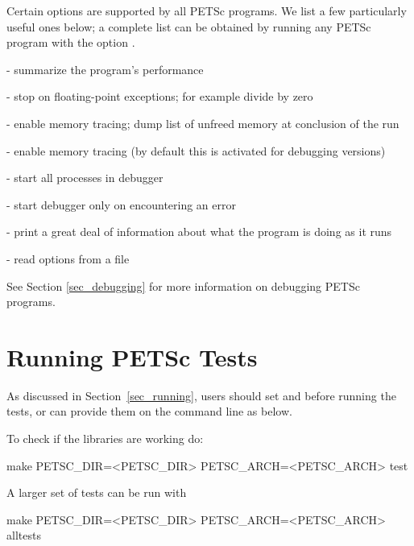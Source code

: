 Certain options are supported by all PETSc programs.  We list a few
particularly useful ones below; a complete list can be obtained by
running any PETSc program with the option .
\begin{tightitemize}
\item {} - summarize the program's performance
\item {} - stop on floating-point exceptions; 
      for example divide by zero
\item {} - enable memory tracing; dump list of unfreed memory
      at conclusion  of the run
\item {} - enable memory tracing (by default this is
      activated for debugging versions)
\item {}  
     - start all processes in debugger  
\item {}  
       - start debugger only on encountering an error
\item {} - print a great deal of information about what the program is doing as it runs
\item {}  - read options from a file
\end{tightitemize}
See Section \ref{sec_debugging} for more information on debugging PETSc programs.


\section{Running PETSc Tests}
\label{sec_runningtests}

As discussed in Section~\ref{sec_running}, 
users should set  and  before running
the tests, or can provide them on the command line as below.

To check if the libraries are working do:
\begin{bashlisting}
make PETSC_DIR=<PETSC_DIR> PETSC_ARCH=<PETSC_ARCH> test
\end{bashlisting}

A larger set of tests can be run with 
\begin{bashlisting}
make PETSC_DIR=<PETSC_DIR> PETSC_ARCH=<PETSC_ARCH> alltests
\end{bashlisting}

